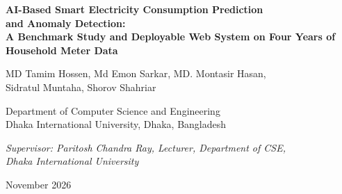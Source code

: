 \documentclass[10pt,a4paper]{article}
\begin{document}
\begin{center}
  {\LARGE\bfseries AI-Based Smart Electricity Consumption Prediction\\[2pt]
   and Anomaly Detection:\\[6pt]
   \large A Benchmark Study and Deployable Web System on Four Years of\\
   Household Meter Data\par}
  \vspace{14pt}
  {\normalsize
  MD Tamim Hossen, Md Emon Sarkar, MD. Montasir Hasan,\\
  Sidratul Muntaha, Shorov Shahriar\par}
  \vspace{5pt}
  {\small Department of Computer Science and Engineering\\
  Dhaka International University, Dhaka, Bangladesh\par}
  \vspace{5pt}
  {\small\itshape Supervisor: Paritosh Chandra Ray, Lecturer, Department of CSE,\\
  Dhaka International University\par}
  \vspace{2pt}
  {\small November 2026\par}
\end{center}
\vspace{6pt}
\end{document}
